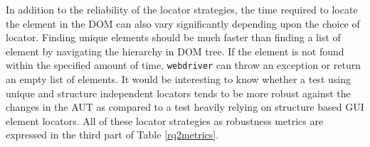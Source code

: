 In addition to the reliability of the locator strategies, the time required to locate the element in the DOM can also vary significantly depending upon the choice of locator. Finding unique elements should be much faster than finding a list of element by navigating the hierarchy in DOM tree. If the element is not found within the specified amount of time, \texttt{webdriver} can throw an exception or return an empty list of elements. It would be interesting to know whether a test using unique and structure independent locators tends to be more robust against the changes in the AUT as compared to a test heavily relying on structure based GUI element locators. All of these locator strategies as robustness metrics are expressed in the third part of Table \ref{rq2metrics}.  











